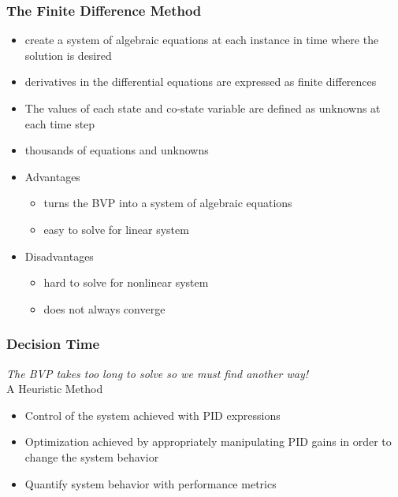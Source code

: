 \documentclass{beamer}
\begin{document}
\begin{frame}
\frametitle{The Finite Difference Method}

\begin{itemize}

\item create a system of algebraic equations at each instance in time where the solution is desired
\item derivatives in the differential equations are expressed as finite differences
\item The values of each state and co-state variable are defined as unknowns at each time step
\item thousands of equations and unknowns
\end{itemize}

\begin{itemize}
\item Advantages
    \begin{itemize}
        \item turns the BVP into a system of algebraic equations
        \item easy to solve for linear system
    \end{itemize}
\item Disadvantages
    \begin{itemize}
        \item hard to solve for nonlinear system
        \item does not always converge
    \end{itemize}
\end{itemize}

\end{frame}





\begin{frame}
\frametitle{Decision Time}

\textit{The BVP takes too long to solve so we must find another way!}\\

A Heuristic Method

\begin{itemize}
\item Control of the system achieved with PID expressions
\item Optimization achieved by appropriately manipulating PID gains in order to change the system behavior
\item Quantify system behavior with performance metrics
\end{itemize}

\end{frame}
\end{document}
